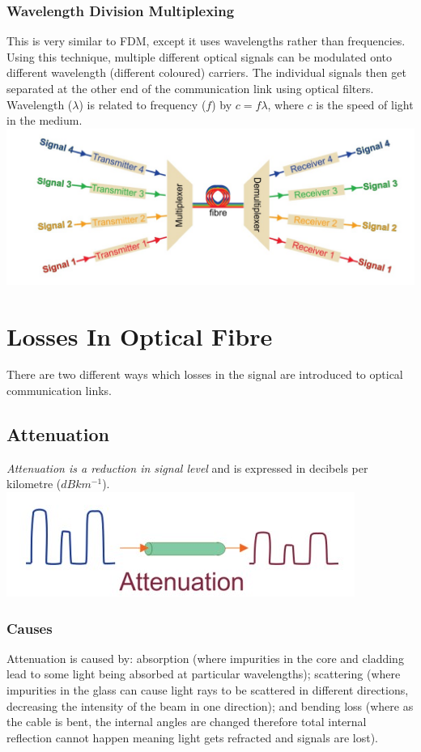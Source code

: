 \documentclass[a4paper,11pt, twocolumn]{article}
\begin{document}
\subsubsection{Wavelength Division Multiplexing}
This is very similar to FDM, except it uses wavelengths rather than frequencies. Using this technique, multiple different optical signals can be modulated onto different wavelength (different coloured) carriers. The individual signals then get separated at the other end of the communication link using optical filters. Wavelength ($\lambda$) is related to frequency ($f$) by $c = f \lambda$, where $c$ is the speed of light in the medium.
\includegraphics[width=\linewidth]{wdm.jpg}

\section{Losses In Optical Fibre}
There are two different ways which losses in the signal are introduced to optical communication links.
\subsection{Attenuation}
\textit{Attenuation is a reduction in signal level} and is expressed in decibels per kilometre ($dBkm^{-1}$).
\includegraphics[width=\linewidth]{attenuationm.jpg}
\subsubsection{Causes}
Attenuation is caused by: absorption (where impurities in the core and cladding lead to some light being absorbed at particular wavelengths); scattering (where impurities in the glass can cause light rays to be scattered in different directions, decreasing the intensity of the beam in one direction); and bending loss (where as the cable is bent, the internal angles are changed therefore total internal reflection cannot happen meaning light gets refracted and signals are lost).
\end{document}
